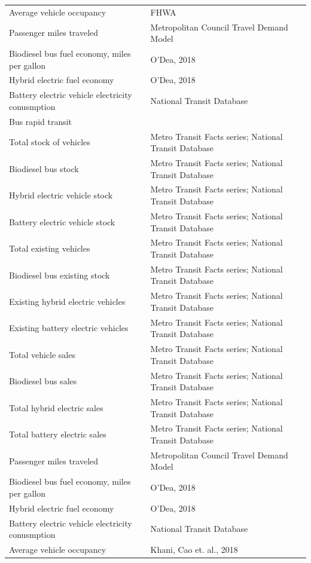 \documentclass[
]{book}
\begin{document}
\begin{longtable}{ll}
Average vehicle occupancy & FHWA \\ 
Passenger miles traveled & Metropolitan Council Travel Demand Model \\ 
Biodiesel bus fuel economy, miles per gallon & O'Dea, 2018 \\ 
Hybrid electric fuel economy & O'Dea, 2018 \\ 
Battery electric vehicle electricity conusmption & National Transit Database \\ 
\midrule
\multicolumn{2}{l}{Bus rapid transit} \\ 
\midrule
Total stock of vehicles & Metro Transit Facts series; National Transit Database \\ 
Biodiesel bus stock & Metro Transit Facts series; National Transit Database \\ 
Hybrid electric vehicle stock & Metro Transit Facts series; National Transit Database \\ 
Battery electric vehicle stock & Metro Transit Facts series; National Transit Database \\ 
Total existing vehicles & Metro Transit Facts series; National Transit Database \\ 
Biodiesel bus existing stock & Metro Transit Facts series; National Transit Database \\ 
Existing hybrid electric vehicles & Metro Transit Facts series; National Transit Database \\ 
Existing battery electric vehicles & Metro Transit Facts series; National Transit Database \\ 
Total vehicle sales & Metro Transit Facts series; National Transit Database \\ 
Biodiesel bus sales & Metro Transit Facts series; National Transit Database \\ 
Total hybrid electric sales & Metro Transit Facts series; National Transit Database \\ 
Total battery electric sales & Metro Transit Facts series; National Transit Database \\ 
Passenger miles traveled & Metropolitan Council Travel Demand Model \\ 
Biodiesel bus fuel economy, miles per gallon & O'Dea, 2018 \\ 
Hybrid electric fuel economy & O'Dea, 2018 \\ 
Battery electric vehicle electricity conusmption & National Transit Database \\ 
Average vehicle occupancy & Khani, Cao et. al., 2018 \\ 

\end{longtable}
\end{document}
